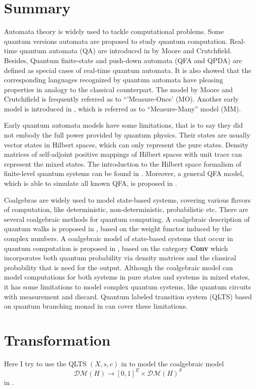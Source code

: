 \documentclass{llncs}
\begin{document}
\section{Summary}
Automata theory is widely used to tackle computational problems. Some quantum versions automata are proposed to study quantum computation. Real-time quantum automata (QA) are introduced in \cite{CJ00} by Moore and Crutchfield. Besides, Quantum finite-state and push-down automata (QFA and QPDA) are defined as special cases of real-time quantum automata. It is also showed that the corresponding languages recognized by quantum automata have pleasing properties in analogy to the classical counterpart. The model by Moore and Crutchifield is frequently referred as to ``'Measure-Once' (MO). Another early model is introduced in \cite{AJ97}, which is referred as to ``Measure-Many'' model (MM).

Early quantum automata models have some limitations, that is to say they did not embody the full power provided by quantum physics. Their states are usually vector states in Hilbert spaces, which can only represent the pure states. Density matrices of self-adjoint positive mappings of Hilbert spaces with unit trace can represent the mixed states. The introduction to the Hilbert space formalism of finite-level quantum systems can be found in \cite{M11}. Moreover, a general QFA model, which is able to simulate all known QFA, is proposed in \cite{AA14}.

Coalgebras are widely used to model state-based systems, covering various flavors of computation, like deterministic, non-deterministic, probabilistic etc. There are several coalgebraic methods for quantum computing. A coalgebraic description of quantum walks is proposed in \cite{B11}, based on the weight functor induced by the complex numbers. A coalgebraic model of state-based systems that occur in quantum computation is proposed in \cite{F12}, based on the category \textbf{Conv} which incorporates both quantum probability via density matrices and the classical probability that is need for the output. Although the coalgebraic model can model computations for both systems in pure states and systems in mixed states, it has some limitations to model complex quantum systems, like quantum circuits with measurement and discard. Quantum labeled transition system (QLTS) based on quantum branching monad in \cite{H14} can cover these limitations. 

\section{Transformation}
Here I try to use the QLTS $(X,s,c)$ in \cite{H14} to model the coalgebraic model $$\mathcal{DM}(H)\rightarrow [0,1]^{E}\times \mathcal{DM}(H)^{S}$$ in \cite{F12}.
\end{document}
